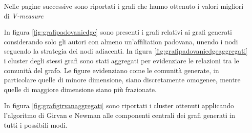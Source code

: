 \documentclass[12pt,a4paper,twoside]{report}
\begin{document}
Nelle pagine successive sono riportati i grafi che hanno ottenuto i valori migliori di
\textit{V-measure}

In figura \ref{fig:grafipadovaniedge} sono presenti i grafi relativi ai grafi generati considerando
solo gli autori con almeno un'affiliation padovana, unendo i nodi seguendo la strategia dei nodi
adiacenti. In figura \ref{fig:grafipadovaniedgeaggregati} i cluster degli stessi grafi sono stati
aggregati per evidenziare le relazioni tra le comunità del grafo. Le figure evidenziano come le
comunità generate, in particolare quelle di minore dimensione, siano discretamente omogenee, mentre
quelle di maggiore dimensione siano più frazionate.


In figura \ref{fig:grafigirvanaggregati} sono riportati i cluster ottenuti applicando l'algoritmo di
Girvan e Newman alle componenti centrali dei grafi generati in tutti i possibili modi.
\end{document}
